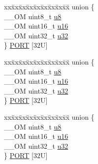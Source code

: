 \begin{DoxyCompactItemize}
\item 
\begin{tabbing}
xx\=xx\=xx\=xx\=xx\=xx\=xx\=xx\=xx\=\kill
union \{\\
\>\_\_OM uint8\_t \mbox{\hyperlink{struct_i_t_m___type_ae773bf9f9dac64e6c28b14aa39f74275}{u8}}\\
\>\_\_OM uint16\_t \mbox{\hyperlink{struct_i_t_m___type_a962a970dfd286cad7f8a8577e87d4ad3}{u16}}\\
\>\_\_OM uint32\_t \mbox{\hyperlink{struct_i_t_m___type_a5834885903a557674f078f3b71fa8bc8}{u32}}\\
\} \mbox{\hyperlink{struct_i_t_m___type_a2fc80b848dc9408836b15f1672b69ff6}{PORT}} \mbox{[}32U\mbox{]}\\

\end{tabbing}\item 
\begin{tabbing}
xx\=xx\=xx\=xx\=xx\=xx\=xx\=xx\=xx\=\kill
union \{\\
\>\_\_OM uint8\_t \mbox{\hyperlink{struct_i_t_m___type_ae773bf9f9dac64e6c28b14aa39f74275}{u8}}\\
\>\_\_OM uint16\_t \mbox{\hyperlink{struct_i_t_m___type_a962a970dfd286cad7f8a8577e87d4ad3}{u16}}\\
\>\_\_OM uint32\_t \mbox{\hyperlink{struct_i_t_m___type_a5834885903a557674f078f3b71fa8bc8}{u32}}\\
\} \mbox{\hyperlink{struct_i_t_m___type_a6ca4dbb3a8d0a64815b500481c226370}{PORT}} \mbox{[}32U\mbox{]}\\

\end{tabbing}\item 
\begin{tabbing}
xx\=xx\=xx\=xx\=xx\=xx\=xx\=xx\=xx\=\kill
union \{\\
\>\_\_OM uint8\_t \mbox{\hyperlink{struct_i_t_m___type_ae773bf9f9dac64e6c28b14aa39f74275}{u8}}\\
\>\_\_OM uint16\_t \mbox{\hyperlink{struct_i_t_m___type_a962a970dfd286cad7f8a8577e87d4ad3}{u16}}\\
\>\_\_OM uint32\_t \mbox{\hyperlink{struct_i_t_m___type_a5834885903a557674f078f3b71fa8bc8}{u32}}\\
\} \mbox{\hyperlink{struct_i_t_m___type_a0a29b660072699beb29486fe5e1675a3}{PORT}} \mbox{[}32U\mbox{]}\\


\end{tabbing}
\end{DoxyCompactItemize}
